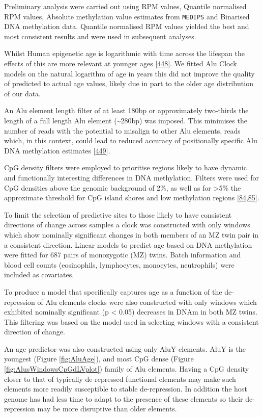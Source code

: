 \documentclass[
]{book}
\begin{document}
Preliminary analysis were carried out using RPM values, Quantile normalised RPM values, Absolute methylation value estimates from \texttt{MEDIPS} and Binarised DNA methylation data.
Quantile normalised RPM values yielded the best and most consistent results and were used in subsequent analyses.

Whilst Human epigenetic age is logarithmic with time across the lifespan the effects of this are more relevant at younger ages {[}\protect\hyperlink{ref-Snir2019}{448}{]}.
We fitted Alu Clock models on the natural logarithm of age in years this did not improve the quality of predicted to actual age values, likely due in part to the older age distribution of our data.

An Alu element length filter of at least 180bp or approximately two-thirds the length of a full length Alu element (\textasciitilde280bp) was imposed.
This minimises the number of reads with the potential to misalign to other Alu elements, reads which, in this context, could lead to reduced accuracy of positionally specific Alu DNA methylation estimates {[}\protect\hyperlink{ref-Hellen2013}{449}{]}.

CpG density filters were employed to prioritise regions likely to have dynamic and functionally interesting differences in DNA methylation.
Filters were used for CpG densities above the genomic background of 2\%, as well as for \textgreater5\% the approximate threshold for CpG island shores and low methylation regions {[}\protect\hyperlink{ref-Stadler2011}{84},\protect\hyperlink{ref-Irizarry2009}{85}{]}.

To limit the selection of predictive sites to those likely to have consistent directions of change across samples a clock was constructed with only windows which show nominally significant changes in both members of an MZ twin pair in a consistent direction.
Linear models to predict age based on DNA methylation were fitted for 687 pairs of monozygotic (MZ) twins.
Batch information and blood cell counts (eosinophils, lymphocytes, monocytes, neutrophils) were included as covariates.

To produce a model that specifically captures age as a function of the de-repression of Alu elements clocks were also constructed with only windows which exhibited nominally significant (p \textless{} 0.05) decreases in DNAm in both MZ twins.
This filtering was based on the model used in selecting windows with a consistent direction of change.

An age predictor was also constructed using only AluY elements.
AluY is the youngest (Figure \ref{fig:AluAge}), and most CpG dense (Figure \ref{fig:AlusWindowsCpGdLVplot}) family of Alu elements.
Having a CpG density closer to that of typically de-repressed functional elements may make such elements more readily susceptible to stable de-repression.
In addition the host genome has had less time to adapt to the presence of these elements so their de-repression may be more disruptive than older elements.
\end{document}

